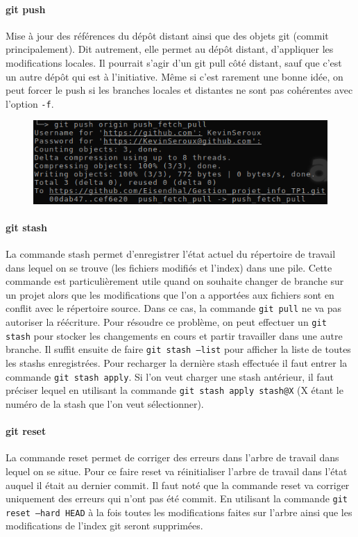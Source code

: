 \documentclass[11pt,canadien]{article}
\begin{document}
\paragraph{git push}Mise à jour des références du dépôt distant ainsi que des objets git (commit principalement). Dit autrement, elle permet au dépôt distant, d'appliquer les modifications locales. Il pourrait s'agir d'un git pull côté distant, sauf que c'est un autre dépôt qui est à l'initiative. Même si c'est rarement une bonne idée, on peut forcer le push si les branches locales et distantes ne sont pas cohérentes avec l'option \texttt{-f}.
\begin{figure}[H]
	\centering
	\includegraphics{images/git_push.png}
\end{figure}

\paragraph{git stash}La commande stash permet d'enregistrer l'état actuel du répertoire de travail dans lequel on se trouve (les fichiers modifiés et l'index) dans une pile. Cette commande est particulièrement utile quand on souhaite changer de branche sur un projet alors que les modifications que l'on a apportées aux fichiers sont en conflit avec le répertoire source. Dans ce cas, la commande \texttt{git pull} ne va pas autoriser la réécriture. Pour résoudre ce problème, on peut effectuer un \texttt{git stash} pour stocker les changements en cours et partir travailler dans une autre branche. Il suffit ensuite de faire \texttt{git stash --list} pour afficher la liste de toutes les stashs enregistrées. Pour recharger la dernière stash effectuée il faut entrer la commande \texttt{git stash apply}. Si l'on veut charger une stash antérieur, il faut préciser lequel en utilisant la commande \texttt{git stash apply stash@{X}} (X étant le numéro de la stash que l'on veut sélectionner). 

\paragraph{git reset}La commande reset permet de corriger des erreurs dans l'arbre de travail dans lequel on se situe. Pour ce faire reset va réinitialiser l'arbre de travail dans l'état auquel il était au dernier commit. Il faut noté que la commande reset va corriger uniquement des erreurs qui n'ont pas été commit. En utilisant la commande \texttt{git reset --hard HEAD} à la fois toutes les modifications faites sur l'arbre ainsi que les modifications de l'index git seront supprimées.
\end{document}

